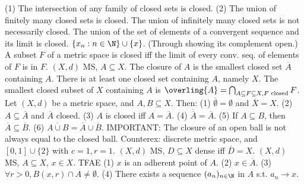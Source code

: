 (1) The intersection of any family of closed sets is closed.
(2) The union of finitely many closed sets is closed.
 The union of infinitely many closed sets
is not necessarily closed.
 The union of the set of elements of a convergent sequence
and its limit is closed. $\{x_n : n \in \N\} \cup \{x\}$.
(Through showing its complement open.)
 A subset $F$ of a metric space is closed iff
the limit of every conv. seq. of elements of $F$ is in $F$.
 $(X,d)$ MS, $A \subseteq X$.
The closure of $A$ is the smallest closed set $\overline{A}$ containing $A$.
There is at least one closed set containing $A$,
namely $X$.
The smallest closed subset of $X$ containing $A$ is
$\overling{A} = \bigcap_{A \subseteq F \subseteq X, F \text{ closed}} F$.
 Let $(X, d)$ be a metric space, and $A, B \subseteq X$. Then:
(1) $\overline{\emptyset} = \emptyset$ and $\overline{X} = X$.
(2) $A \subseteq \overline{A}$ and $\overline{A}$ closed.
(3) $A$ is closed iff $A = \overline{A}$.
(4) $\overline{\overline{A}} = \overline{A}$.
(5) If $A \subseteq B$, then $\overline{A} \subseteq \overline{B}$.
(6) $\overline{A \cup B} = \overline{A} \cup \overline{B}$.
IMPORTANT: The closure of an open ball is not always equal to the closed ball.
Counterex: discrete metric space, and $[0,1] \cup \{2\}$ with $c=1, r=1$.
 $(X,d)$ MS, $D \subseteq X$ dense iff $\overline{D} = X$.
 $(X,d)$ MS, $A \subseteq X$, $x \in X$. TFAE
(1) $x$ is an adherent point of $A$.
(2) $x \in \overline{A}$.
(3) $\forall r > 0, B(x, r) \cap A \neq \emptyset$.
(4) There exists a sequence $(a_n)_{n \in \N}$ in $A$ s.t. $a_n \to x$.
